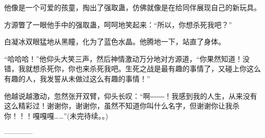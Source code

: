 \begin{this_body}
他像是一个可爱的孩童，掏出了强取蛊，仿佛就像是在给同伴展现自己的新玩具。

方源瞥了一眼他手中的强取蛊，呵呵地笑起来：“所以，你想杀死我吧？”

白凝冰双眼猛地从黑瞳，化为了蓝色水晶。他腾地一下，站直了身体。

“哈哈哈！”他仰头大笑三声，然后神情激动万分地对方源道，“你果然知道！没错，我就想杀死你，你也来杀死我吧。生死之战是最有趣的事情了，又碰上你这么有趣的人，我发誓从未做过这么有趣的事情！”

他越说越激动，忽然张开双臂，仰头长叹：“啊――！我感到我的人生，从来没有这么精彩过！谢谢你，谢谢你，虽然不知道你叫什么名字，但谢谢你让我杀你！！！嘎嘎嘎……”(未完待续。。)

------------

\end{this_body}

